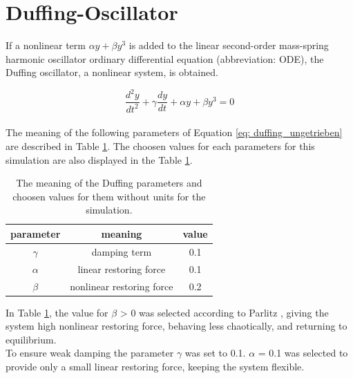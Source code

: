 \documentclass[oneside,10pt,a4paper]{report}
\begin{document}
		\section{Duffing-Oscillator}
		If a nonlinear term $\alpha y + \beta y^3$ is added to the linear second-order mass-spring harmonic oscillator ordinary differential equation (abbreviation: ODE), the Duffing oscillator\cite{twist_paper}, a nonlinear system, is obtained.
		
		\begin{equation}\label{eq: duffing_ungetrieben}
			\frac{d^2y}{dt^2} + \gamma \frac{dy}{dt} + \alpha y + \beta y^3 = 0
		\end{equation}
		\\
		The meaning of the following parameters of Equation \ref{eq: duffing_ungetrieben} are described in Table \ref{tab: duffing_ungetriebene_parameter}. The choosen values for each parameters for this simulation are also displayed in the Table \ref{tab: duffing_ungetriebene_parameter}.
		
			\begin{table}[H]
			\centering
			\caption{The meaning of the Duffing parameters and choosen values for them without units for the simulation.}
			\label{tab: duffing_ungetriebene_parameter}
			\begin{tabular}{c c c}
				\toprule
				parameter & meaning & value\\
				\midrule
				$\gamma$ & damping term & 0.1\\
				$\alpha$ & linear restoring force & 0.1\\
				$\beta$& nonlinear restoring force & 0.2\cite{Parlitz_p93}\\
				\bottomrule
			\end{tabular}
		\end{table}
		
		In Table \ref{tab: duffing_ungetriebene_parameter}, the value for $\beta$ > 0 was selected according to Parlitz \cite{Parlitz_p93}, giving the system high nonlinear restoring force, behaving less chaotically, and returning to equilibrium. \\
		To ensure weak damping the parameter $\gamma$ was set to 0.1. $\alpha$ = 0.1 was selected to provide only a small linear restoring force, keeping the system flexible.
		
\end{document}
